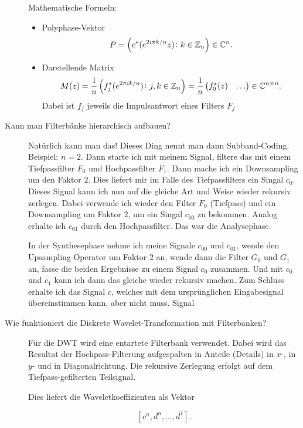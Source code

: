 \begin{description}
  	Mathematische Formeln:
  	\begin{itemize}
    	\item Polyphase-Vektor
    	\[
      	P = \left( c^{*}(e^{2i\pi k/n}z) \colon k \in \mathbb{Z}_{n} \right) \in \mathbb{C}^{n}.
    	\]
    	\item Darstellende Matrix
    	\[
      	M(z) =
      	\frac{1}{n} \left( f^{*}_{j}(e^{2\pi i k / n}) \colon j,k \in \mathbb{Z}_{n} \right) 
      	= \frac{1}{n} \begin{pmatrix}
      	f^{*}_{0}(z) & \hdots
      	\end{pmatrix} \in \mathbb{C}^{n \times n}.
    	\]
    	Dabei ist $ f_{j} $ jeweils die Impulsantwort eines Filters $ F_{j} $
  	\end{itemize}
	\item[Kann man Filterbänke hierarchisch aufbauen?]
  	Natürlich kann man das! Dieses Ding nennt man dann Subband-Coding. Beispiel: $ n = 2 $. Dann 
  	starte ich mit meinem Signal, filtere das mit einem Tiefpassfilter $ F_{0} $ und Hochpassfilter 
  	$ F_{1} $. Dann mache ich ein Downsampling um den Faktor $ 2 $. Dies liefert mir im Falle des 
  	Tiefpassfilters ein Singal $ c_{0} $. Dieses Signal kann ich nun auf die gleiche Art und Weise 
  	wieder rekursiv zerlegen. Dabei verwende ich wieder den Filter $ F_{0} $ (Tiefpass) und ein 
  	Downsampling um Faktor $ 2 $, um ein Singal $ c_{00} $ zu bekommen. Analog erhalte ich $ c_{01} 
  	$ durch den Hochpassfilter. Das war die Analysephase.
  	
  	In der Synthesephase nehme ich meine Signale $ c_{00} $ und $ c_{01} $, wende den 
  	Upsampling-Operator um Faktor $ 2 $ an, wende dann die Filter $ G_{0} $ und $ G_{1} $ an, fasse 
  	die beiden Ergebnisse zu einem Signal $ c_{0} $ zusammen. Und mit $ c_{0} $ und $ c_{1} $ kann 
  	ich dann das gleiche wieder rekursiv machen. Zum Schluss erhalte ich das Signal $ c $, welches 
  	mit dem ursprünglichen Eingabesignal übereinstimmen kann, aber nicht muss.
  	Signal 
  \item [Wie funktioniert die Diskrete Wavelet-Transformation mit Filterbänken?] 
    Für die DWT wird eine entartete Filterbank verwendet. Dabei wird das Resultat
    der Hochpass-Filterung aufgespalten in Anteile (Details) in $x$-, in $y$- und in Diagonalrichtung.
    Die rekursive Zerlegung erfolgt auf dem Tiefpass-gefilterten Teilsignal.

    Dies liefert die Waveletkoeffizienten als Vektor

    $$ [c^n,d^n,\ldots,d^1]. $$


\end{description}

